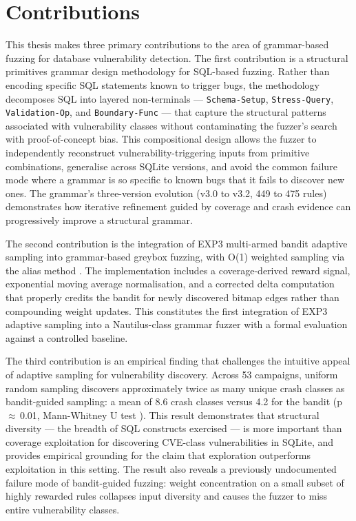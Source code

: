 \section{Contributions}

This thesis makes three primary contributions to the area of grammar-based fuzzing for database vulnerability detection. The first contribution is a structural primitives grammar design methodology for SQL-based fuzzing. Rather than encoding specific SQL statements known to trigger bugs, the methodology decomposes SQL into layered non-terminals — \texttt{Schema-Setup}, \texttt{Stress-Query}, \texttt{Validation-Op}, and \texttt{Boundary-Func} — that capture the structural patterns associated with vulnerability classes without contaminating the fuzzer's search with proof-of-concept bias. This compositional design allows the fuzzer to independently reconstruct vulnerability-triggering inputs from primitive combinations, generalise across SQLite versions, and avoid the common failure mode where a grammar is so specific to known bugs that it fails to discover new ones. The grammar's three-version evolution (v3.0 to v3.2, 449 to 475 rules) demonstrates how iterative refinement guided by coverage and crash evidence can progressively improve a structural grammar.

The second contribution is the integration of EXP3 multi-armed bandit adaptive sampling into grammar-based greybox fuzzing, with O(1) weighted sampling via the alias method \cite{loadeddice}. The implementation includes a coverage-derived reward signal, exponential moving average normalisation, and a corrected delta computation that properly credits the bandit for newly discovered bitmap edges rather than compounding weight updates. This constitutes the first integration of EXP3 adaptive sampling into a Nautilus-class grammar fuzzer with a formal evaluation against a controlled baseline.

The third contribution is an empirical finding that challenges the intuitive appeal of adaptive sampling for vulnerability discovery. Across 53 campaigns, uniform random sampling discovers approximately twice as many unique crash classes as bandit-guided sampling: a mean of 8.6 crash classes versus 4.2 for the bandit (p\,$\approx$\,0.01, Mann-Whitney U test \cite{mannwhitney}). This result demonstrates that structural diversity — the breadth of SQL constructs exercised — is more important than coverage exploitation for discovering CVE-class vulnerabilities in SQLite, and provides empirical grounding for the claim that exploration outperforms exploitation in this setting. The result also reveals a previously undocumented failure mode of bandit-guided fuzzing: weight concentration on a small subset of highly rewarded rules collapses input diversity and causes the fuzzer to miss entire vulnerability classes.

